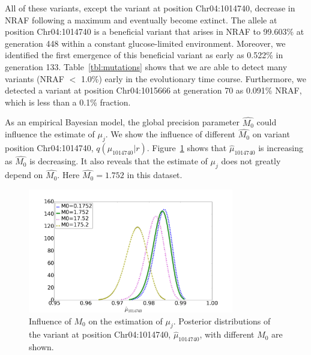 \documentclass[11pt,reqno]{amsart}
\begin{document}
All of these variants, except the variant at position Chr04:1014740, decrease in NRAF following a maximum and eventually become extinct.
The allele at position Chr04:1014740 is a beneficial variant that arises in NRAF to 99.603\% at generation 448 within a constant glucose-limited environment.
Moreover, we identified the first emergence of this beneficial variant as early as 0.522\% in generation 133.
Table~\ref{tbl:mutations} shows that we are able to detect many variants (NRAF $<$ 1.0\%) early in the evolutionary time course.
Furthermore, we detected a variant at position Chr04:1015666 at generation 70 as 0.091\% NRAF, which is less than a 0.1\% fraction.

As an empirical Bayesian model, the global precision parameter $\hat{M_0}$ could influence the estimate of $\mu_j$.
We show the influence of different $\hat{M_0}$ on variant position Chr04:1014740, $q(\mu_{1014740}|r)$.
Figure~\ref{tbl:M0} shows that $\hat{\mu}_{1014740}$ is increasing as $\hat{M_0}$ is decreasing.
It also reveals that the estimate of $\mu_j$ does not greatly depend on $\hat{M_0}$.
Here $\hat{M_0} = 1.752$ in this dataset.
\begin{figure}[htbp]
\centering
\includegraphics[width=0.8\textwidth]{figs/diff_M0.png}
\caption{Influence of $M_0$ on the estimation of $\mu_j$.
Posterior distributions of the variant at position Chr04:1014740, $\hat{\mu}_{1014740}$, with different $M_0$ are shown.}
\label{tbl:M0}
\end{figure}
\end{document}
